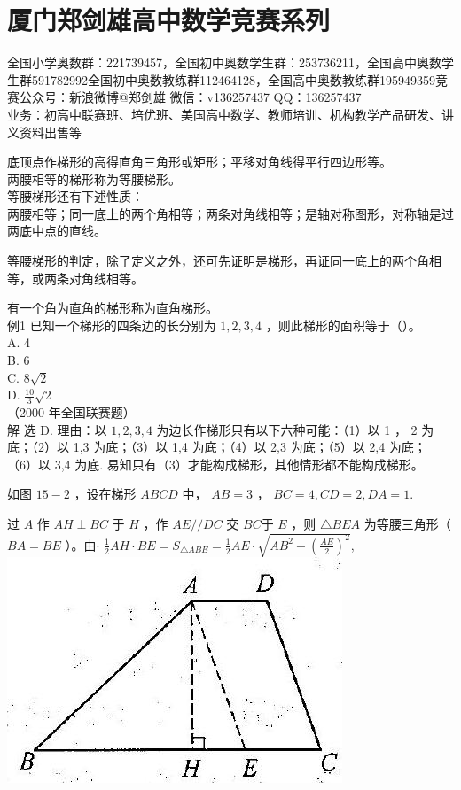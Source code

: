 \documentclass[10pt]{article}
\begin{document}
\section*{厦门郑剑雄高中数学竞赛系列}
全国小学奥数群：221739457，全国初中奥数学生群：253736211，全国高中奥数学生群591782992全国初中奥数教练群112464128，全国高中奥数教练群195949359竞赛公众号：新浪微博@郑剑雄 微信：v136257437 QQ：136257437\\
业务：初高中联赛班、培优班、美国高中数学、教师培训、机构教学产品研发、讲义资料出售等

底顶点作梯形的高得直角三角形或矩形；平移对角线得平行四边形等。\\
两腰相等的梯形称为等腰梯形。\\
等腰梯形还有下述性质：\\
两腰相等；同一底上的两个角相等；两条对角线相等；是轴对称图形，对称轴是过两底中点的直线。

等腰梯形的判定，除了定义之外，还可先证明是梯形，再证同一底上的两个角相等，或两条对角线相等。

有一个角为直角的梯形称为直角梯形。\\
例1 已知一个梯形的四条边的长分别为 $1,2,3,4$ ，则此梯形的面积等于（）。\\
A. 4\\
B. 6\\
C. $8 \sqrt{2}$\\
D. $\frac{10}{3} \sqrt{2}$\\
（2000 年全国联赛题）\\
解 选 D. 理由：以 $1,2,3,4$ 为边长作梯形只有以下六种可能：（1）以 1 ， 2 为底；（2）以 1,3 为底；（3）以 1,4 为底；（4）以 2,3 为底；（5）以 2,4 为底； （6）以 3,4 为底. 易知只有（3）才能构成梯形，其他情形都不能构成梯形。

如图 $15-2$ ，设在梯形 $A B C D$ 中， $A B=3$ ， $B C=4, C D=2, D A=1$.

过 $A$ 作 $A H \perp B C$ 于 $H$ ，作 $A E / / D C$ 交 $B C$于 $E$ ，则 $\triangle B E A$ 为等腰三角形（ $B A=B E$ ）。由$\cdot$ $\frac{1}{2} A H \cdot B E=S_{\triangle A B E}=\frac{1}{2} A E \cdot \sqrt{A B^{2}-\left(\frac{A E}{2}\right)^{2}}$,\\
\includegraphics[max width=\textwidth, center]{2024_10_30_2c8f45efd4a519b08e1ag-138(1)}
\end{document}
